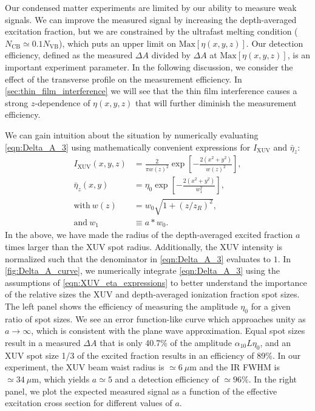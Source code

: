 Our condensed matter experiments are limited by our ability to measure weak signals. We can improve the measured signal by increasing the depth-averaged excitation fraction, but we are constrained by the ultrafast melting condition ($N_{\textrm{CB}} \simeq 0.1 N_{\textrm{VB}}$), which puts an upper limit on $\textrm{Max}[\eta(x,y,z)]$. Our detection efficiency, defined as the measured $\Delta A$ divided by $\Delta A$ at $\textrm{Max}[\eta(x,y,z)]$, is an important experiment parameter. In the following discussion, we consider the effect of the transverse profile on the measurement efficiency. In \cref{sec:thin_film_interference} we will see that the thin film interference causes a strong $z$-dependence of $\eta(x,y,z)$ that will further diminish the measurement efficiency.

We can gain intuition about the situation by numerically evaluating \cref{eqn:Delta_A_3} using mathematically convenient expressions for $I_{\textrm{XUV}}$ and $\bar{\eta}_z$:
\begin{equation}
\begin{aligned}
I_{\textrm{XUV}} (x,y,z) &= \frac{2}{\pi w(z)^2} \exp \left[ - \frac{2 (x^2 + y^2)}{w(z)^2} \right], \\
\bar{\eta}_z(x,y) &= \eta_0 \exp \left[ -\frac{2(x^2 + y^2)}{w_1^2} \right], \\
\textrm{with} \ w(z) &= w_0 \sqrt{1 + (z/z_R)^2}, \\
\textrm{and} \ w_1 &\equiv a*w_0.
\end{aligned}
\label{eqn:XUV_eta_expressions}
\end{equation}
In the above, we have made the radius of the depth-averaged excited fraction $a$ times larger than the XUV spot radius. Additionally, the XUV intensity is normalized such that the denominator in \cref{eqn:Delta_A_3} evaluates to $1$. In \cref{fig:Delta_A_curve}, we numerically integrate \cref{eqn:Delta_A_3} using the assumptions of \cref{eqn:XUV_eta_expressions} to better understand the importance of the relative sizes the XUV and depth-averaged ionization fraction spot sizes. The left panel shows the efficiency of measuring the amplitude $\eta_0$ for a given ratio of spot sizes. We see an error function-like curve which approaches unity as $a \rightarrow \infty$, which is consistent with the plane wave approximation. Equal spot sizes result in a measured $\Delta A$ that is only 40.7\% of the amplitude $\alpha_{10} L \eta_0$, and an XUV spot size 1/3 of the excited fraction results in an efficiency of 89\%. In our experiment, the XUV beam waist radius is $\simeq 6 \ \mu \textrm{m}$ and the IR FWHM is $\simeq 34 \ \mu \textrm{m}$, which yields $a \simeq 5$ and a detection efficiency of $\simeq 96\%$. In the right panel, we plot the expected measured signal as a function of the effective excitation cross section for different values of $a$.

